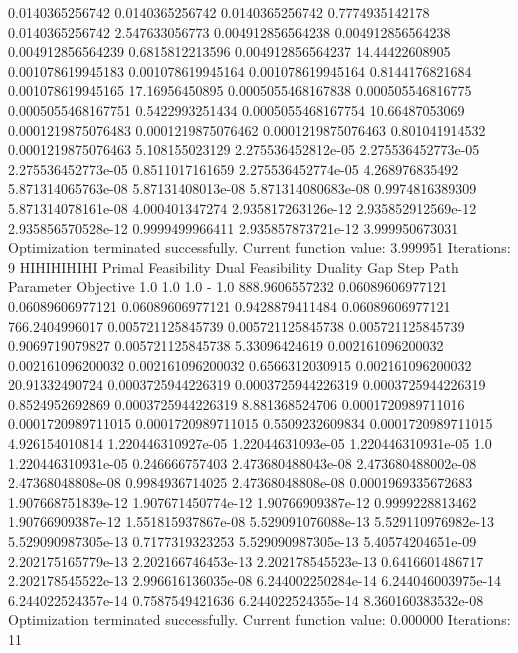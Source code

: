 \documentclass[letterpaper,10pt,english]{sphinxmanual}
\begin{document}
{\begin{sphinxVerbatim}[commandchars=\\\{\}]
0.0140365256742     0.0140365256742     0.0140365256742     0.7774935142178  0.0140365256742     2.547633056773
0.004912856564238   0.004912856564238   0.004912856564239   0.6815812213596  0.004912856564237   14.44422608905
0.001078619945183   0.001078619945164   0.001078619945164   0.8144176821684  0.001078619945165   17.16956450895
0.0005055468167838  0.000505546816775   0.0005055468167751  0.5422993251434  0.0005055468167754  10.66487053069
0.0001219875076483  0.0001219875076462  0.0001219875076463  0.801041914532   0.0001219875076463  5.108155023129
2.275536452812e-05  2.275536452773e-05  2.275536452773e-05  0.8511017161659  2.275536452774e-05  4.268976835492
5.871314065763e-08  5.87131408013e-08   5.871314080683e-08  0.9974816389309  5.871314078161e-08  4.000401347274
2.935817263126e-12  2.935852912569e-12  2.935856570528e-12  0.9999499966411  2.935857873721e-12  3.999950673031
Optimization terminated successfully.
         Current function value: 3.999951
         Iterations: 9
HIHIHIHIHI
Primal Feasibility  Dual Feasibility    Duality Gap         Step             Path Parameter      Objective
1.0                 1.0                 1.0                 -                1.0                 888.9606557232
0.06089606977121    0.06089606977121    0.06089606977121    0.9428879411484  0.06089606977121    766.2404996017
0.005721125845739   0.005721125845738   0.005721125845739   0.9069719079827  0.005721125845738   5.33096424619
0.002161096200032   0.002161096200032   0.002161096200032   0.6566312030915  0.002161096200032   20.91332490724
0.0003725944226319  0.0003725944226319  0.0003725944226319  0.8524952692869  0.0003725944226319  8.881368524706
0.0001720989711016  0.0001720989711015  0.0001720989711015  0.5509232609834  0.0001720989711015  4.926154010814
1.220446310927e-05  1.22044631093e-05   1.220446310931e-05  1.0              1.220446310931e-05  0.246666757403
2.473680488043e-08  2.473680488002e-08  2.47368048808e-08   0.9984936714025  2.47368048808e-08   0.0001969335672683
1.907668751839e-12  1.907671450774e-12  1.90766909387e-12   0.9999228813462  1.90766909387e-12   1.551815937867e-08
5.529091076088e-13  5.529110976982e-13  5.529090987305e-13  0.7177319323253  5.529090987305e-13  5.40574204651e-09
2.202175165779e-13  2.202166746453e-13  2.202178545523e-13  0.6416601486717  2.202178545522e-13  2.996616136035e-08
6.244002250284e-14  6.244046003975e-14  6.244022524357e-14  0.7587549421636  6.244022524355e-14  8.360160383532e-08
Optimization terminated successfully.
         Current function value: 0.000000
         Iterations: 11
\end{sphinxVerbatim}
}
\end{document}
